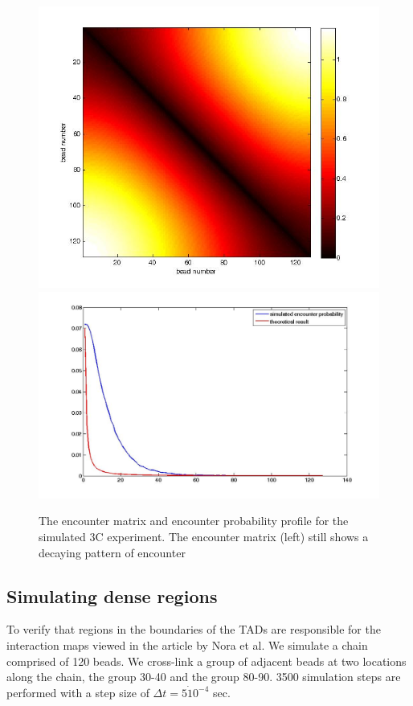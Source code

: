 \documentclass[12pt]{paper}
\begin{document}
\begin{figure}[H]
\includegraphics[scale=0.2]{encounterMatrix3cExperiment}
\includegraphics[scale=0.2]{encounterProbabilityBead1OfThe3cSimulation128Beads}
\caption{The encounter matrix and encounter probability profile for the simulated 3C experiment. The encounter matrix (left) still shows a decaying pattern of encounter}
\end{figure}

\subsection{Simulating dense regions}
To verify that regions in the boundaries of the TADs are responsible for the interaction maps viewed in the article by Nora et al. We simulate a chain comprised of 120 beads. We cross-link a group of adjacent beads at two locations along the chain, the group 30-40 and the group 80-90. 3500 simulation steps are performed with a step size of $\Delta t = 5\dot10^{-4}$ sec. 
\end{document}
